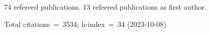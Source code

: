74 refereed publications. 13 refeered publications as first author.

Total citations~=~3534; h-index~=~34 (2023-10-08)